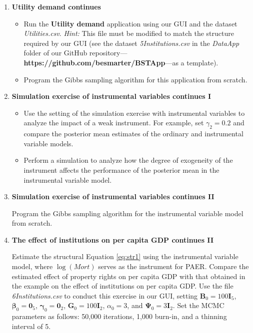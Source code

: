 \begin{enumerate}
	\item \textbf{Utility demand continues}
	
	\begin{itemize}
		\item Run the \textbf{Utility demand} application using our GUI and the dataset \textit{Utilities.csv}. \textit{Hint:} This file must be modified to match the structure required by our GUI (see the dataset \textit{5Institutions.csv} in the \textit{DataApp} folder of our GitHub repository—\textbf{https://github.com/besmarter/BSTApp}—as a template).
		\item Program the Gibbs sampling algorithm for this application from scratch.
	\end{itemize}
	
	\item \textbf{Simulation exercise of instrumental variables continues I}
	
	\begin{itemize}
		\item Use the setting of the simulation exercise with instrumental variables to analyze the impact of a weak instrument. For example, set $\gamma_2 = 0.2$ and compare the posterior mean estimates of the ordinary and instrumental variable models.
		\item Perform a simulation to analyze how the degree of exogeneity of the instrument affects the performance of the posterior mean in the instrumental variable model.
	\end{itemize}
	
	\item \textbf{Simulation exercise of instrumental variables continues II}
	
	Program the Gibbs sampling algorithm for the instrumental variable model from scratch.
	
	\item \textbf{The effect of institutions on per capita GDP continues II}
	
	Estimate the structural Equation \ref{eq:str1} using the instrumental variable model, where $\log(\textit{Mort})$ serves as the instrument for PAER. Compare the estimated effect of property rights on per capita GDP with that obtained in the example on the effect of institutions on per capita GDP. Use the file \textit{6Institutions.csv} to conduct this exercise in our GUI, setting $\bm{B}_0 = 100\bm{I}_5$, $\bm{\beta}_0 = \bm{0}_5$, $\bm{\gamma}_0 = \bm{0}_2$, $\bm{G}_0 = 100\bm{I}_2$, $\alpha_0 = 3$, and $\bm{\Psi}_0 = 3\bm{I}_2$. Set the MCMC parameters as follows: 50,000 iterations, 1,000 burn-in, and a thinning interval of 5.
	

\end{enumerate}
